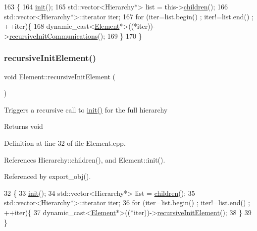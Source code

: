 \begin{DoxyCode}
163                                             \{
164   \hyperlink{classSpecsSlave_ab34b5117373a334027d3a5cf33287bb6}{init}();
165   std::vector<Hierarchy*> list = this->\hyperlink{classHierarchy_aa9a76f69e98e052ee1a6e32cea006288}{children}();
166   std::vector<Hierarchy*>::iterator iter;
167   \textcolor{keywordflow}{for} (iter=list.begin() ; iter!=list.end() ; ++iter)\{
168     \textcolor{keyword}{dynamic\_cast<}\hyperlink{classElement}{Element}*\textcolor{keyword}{>}((*iter))->\hyperlink{classSpecsSlave_a347b94c2ba660ccde6927fe72590a1bc}{recursiveInitCommunications}();
169   \}
170 \}
\end{DoxyCode}
\mbox{\label{classElement_a3c0abcb36f8906688bb7e32608df7086}} 
\subsubsection{\texorpdfstring{recursive\+Init\+Element()}{recursiveInitElement()}}
{\footnotesize\ttfamily void Element\+::recursive\+Init\+Element (\begin{DoxyParamCaption}{ }\end{DoxyParamCaption})\hspace{0.3cm}{\ttfamily [inherited]}}

Triggers a recursive call to \hyperlink{classSpecsSlave_ab34b5117373a334027d3a5cf33287bb6}{init()} for the full hierarchy

\begin{DoxyReturn}{Returns}
void 
\end{DoxyReturn}


Definition at line 32 of file Element.\+cpp.



References Hierarchy\+::children(), and Element\+::init().



Referenced by export\+\_\+obj().


\begin{DoxyCode}
32                                   \{
33   \hyperlink{classElement_af42754b5cabc198869222725218d695c}{init}();
34   std::vector<Hierarchy*> list = \hyperlink{classHierarchy_aa9a76f69e98e052ee1a6e32cea006288}{children}();
35   std::vector<Hierarchy*>::iterator iter;
36   \textcolor{keywordflow}{for} (iter=list.begin() ; iter!=list.end() ; ++iter)\{
37     \textcolor{keyword}{dynamic\_cast<}\hyperlink{classElement}{Element}*\textcolor{keyword}{>}((*iter))->\hyperlink{classElement_a3c0abcb36f8906688bb7e32608df7086}{recursiveInitElement}();
38   \}
39 \}
\end{DoxyCode}
\mbox{\label{classAttrib_a7d4ef7e32d93cb287792b87b857e79f3}} 
